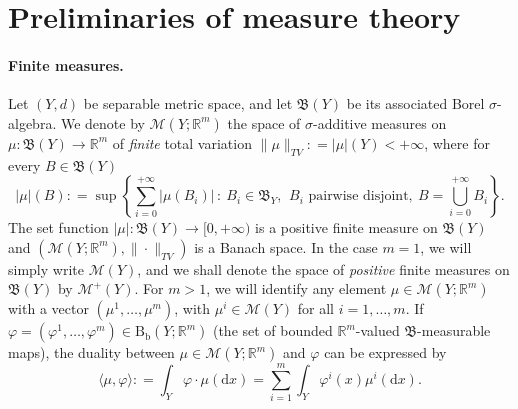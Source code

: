\documentclass[11pt,reqno]{amsart}
\numberwithin{equation}{section}
\newcommand{\R}{\mathbb{R}}
\newcommand{\calM}{\mathcal{M}}
\newcommand{\calP}{\mathcal{P}}
\newcommand{\dd}{\mathrm{d}}
\theoremstyle{definition}
\def\dd{\mathrm{d}}
\newcommand{\Bb}{\mathrm{B}_{\mathrm b}}
\newcommand{\Co}{\mathrm{C}_{0}}
\newcommand{\pinfty}{{+\infty}}
\newcommand{\frB}{\mathfrak B}
\newcommand{\TODOR}[1]{\todo[inline, color=magenta!20]{#1}}
\newcommand{\TODO}[1]{\todo[inline, color=cyan!20]{#1}}
\numberwithin{equation}{section}
\begin{document}
\TODOR{add symbols}


\section{Preliminaries of measure theory}


\paragraph{\bf Finite measures.}
Let $(Y,d)$ be separable metric space, and let 
$\mathfrak{B}(Y)$ be its associated Borel $\sigma$-algebra. 
We denote by 
 $\calM(Y;\R^m)$  the space of  $\sigma$-additive measures  on
 $\mu: \frB(Y) \to \R^m$ 
 of \emph{finite} total variation
 $\|\mu\|_{TV}: =|\mu|(Y)<\pinfty$, where for every $B\in\frB(Y)$
 \[
   |\mu|(B): = \sup \left\{ \sum_{i=0}^\pinfty |\mu(B_i)|\, : \ B_i \in \frB_Y,\, \ B_i \text{ pairwise disjoint}, \ B = \bigcup_{i=0}^\pinfty B_i \right\}.
 \]
 The set function  $|\mu|: \frB(Y) \to [0,\pinfty)$  is a positive
 finite
 measure on $\frB(Y)$ \cite[Thm.\ 1.6]{AmFuPa05FBVF}
 and $(\calM(Y;\R^m),\|\cdot\|_{TV})$ is a Banach space.
 In the case $m=1$, we will simply write $\calM(Y)$,
 and we shall denote the space of \emph{positive} finite
measures on $\frB(Y)$ by $\calM^+(Y)$.
   For $m>1$,
 we will identify any element $\mu \in \calM(Y;\R^m)$ with  a vector
 $(\mu^1,\ldots,\mu^m)$, with $\mu^i \in \calM(Y)$ for all
 $i=1,\ldots, m$.
 If $\varphi
 =(\varphi^1,\ldots,\varphi^m)\in \Bb(Y;\R^m)$ (the set of bounded $\R^m$-valued
 $\frB$-measurable
 maps), the duality between $\mu \in \calM(Y;\R^m)$ and $\varphi$
 can be expressed by 
\begin{equation}
\label{vector-duality-measures}
 \langle\mu,\varphi\rangle : = \int_{Y} \varphi \cdot \mu (\dd x) =
 \sum_{i=1}^m \int_Y  \varphi^i(x) \mu^i(\dd x).
 \end{equation}
\end{document}
